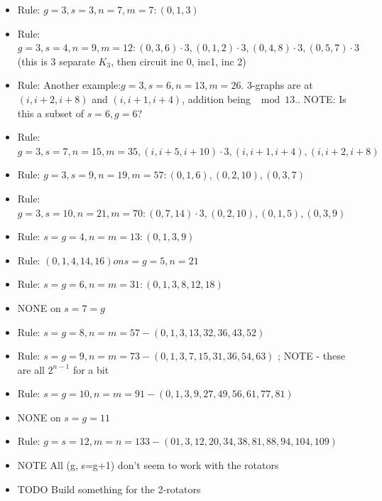 \documentclass[11pt, oneside]{article} 	%
\begin{document}
\begin{itemize}

\item Rule: $g=3, s=3, n=7, m=7: (0,1,3)$
\item Rule: $g=3, s=4, n = 9, m = 12: (0,3,6) \cdot 3, (0,1,2) \cdot 3, (0,4,8) \cdot 3, (0, 5,7) \cdot 3$ (this is 3 separate $K_3$, then circuit inc 0, inc1, inc 2)
\item Rule: Another example:$ g=3, s=6, n=13, m=26$.  3-graphs are at $(i, i+2, i+8)$ and $(i, i+1, i+4)$, addition being $\mod 13$..  NOTE: Is this a subset of $s=6, g=6$?
\item Rule: $g=3, s=7, n=15, m=35, (i, i+5, i+10) \cdot 3, (i, i+1, i+4), (i, i+2, i+8)$
\item Rule: $g=3, s=9, n=19, m=57: (0,1,6), (0,2,10), (0,3,7)$
\item Rule: $g=3, s=10, n=21, m=70: (0,7,14) \cdot 3, (0,2,10), (0,1,5), (0,3,9)$
\item Rule: $s=g=4, n=m=13: (0, 1, 3, 9)$
\item Rule: $(0,1,4,14,16) on s=g=5, n=21$
\item Rule: $s=g=6, n=m=31: (0, 1, 3, 8, 12, 18)$
\item NONE on $s=7=g$
\item Rule: $s=g=8, n=m=57 - (0,1, 3, 13, 32, 36, 43, 52)$
\item Rule: $s=g=9, n=m=73 - (0,1, 3, 7, 15, 31, 36, 54, 63)$  ; NOTE - these are all $2^{n-1}$ for a bit	
\item Rule: $s=g=10, n=m=91 - (0, 1, 3, 9, 27, 49, 56, 61, 77, 81)$
\item NONE on $s=g=11$
\item Rule: $g=s=12, m=n=133 - (0 1, 3, 12, 20, 34, 38, 81, 88, 94, 104, 109)$
\item NOTE All (g, s=g+1) don't seem to work with the rotators
\item TODO Build something for the 2-rotators
\end{itemize}
\end{document}
